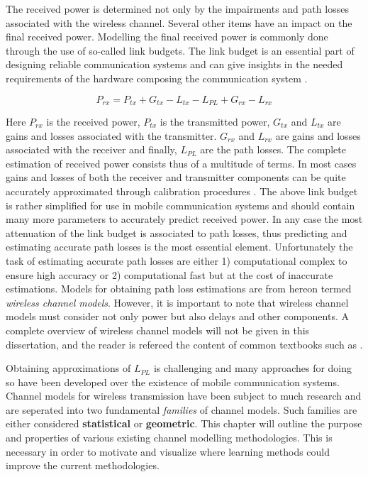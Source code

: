 The received power is determined not only by the impairments and path losses associated with the wireless channel. Several other items have an impact on the final received power. Modelling the final received power is commonly done through the use of so-called link budgets. The link budget is an essential part of designing reliable communication systems and can give insights in the needed requirements of the hardware composing the communication system \cite{Molisch2007}.


\begin{equation}\label{eq:link_budget}
    P_{rx} = P_{tx} + G_{tx} - L_{tx} - L_{PL} + G_{rx} - L_{rx}
\end{equation}

Here $P_{rx}$ is the received power, $P_{tx}$ is the transmitted power, $G_{tx}$ and $L_{tx}$ are gains and losses associated with the transmitter. $G_{rx}$ and $L_{rx}$ are gains and losses associated with the receiver and finally, $L_{PL}$ are the path losses. The complete estimation of received power consists thus of a multitude of terms. In most cases gains and losses of both the receiver and transmitter components can be quite accurately approximated through calibration procedures  \cite{Molisch2007}. The above link budget is rather simplified for use in mobile communication systems and should contain many more parameters to accurately predict received power. In any case the most attenuation of the link budget is associated to path losses, thus predicting and estimating accurate path losses is the most essential element. Unfortunately the task of estimating accurate path losses are either 1) computational complex to ensure high accuracy or 2) computational fast but at the cost of inaccurate estimations. Models for obtaining path loss estimations are from hereon termed \emph{wireless channel models}. However, it is important to note that wireless channel models must consider not only power but also delays and other components. A complete overview of wireless channel models will not be given in this dissertation, and the reader is refereed the content of common textbooks such as \cite{Tse2005FundamentalsCommunication}.

Obtaining approximations of $L_{PL}$ is challenging and many approaches for doing so have been developed over the existence of mobile communication systems. Channel models for wireless transmission have been subject to much research and are seperated into two fundamental \emph{families} of channel models. Such families are either considered \textbf{statistical} or \textbf{geometric}. This chapter will outline the purpose and properties of various existing channel modelling methodologies. This is necessary in order to motivate and visualize where learning methods could improve the current methodologies.


